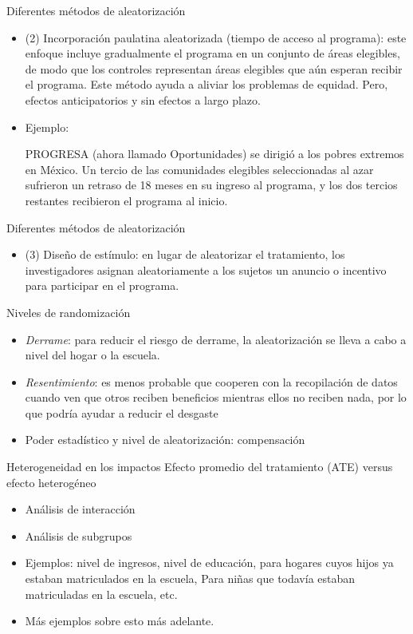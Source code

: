 \documentclass[11pt, aspectratio=169, compress]{beamer}
\begin{document}
\begin{frame}{Diferentes métodos de aleatorización}
	\begin{itemize}
		\item (2) Incorporación paulatina aleatorizada (tiempo de acceso al programa): este enfoque incluye gradualmente el programa en un conjunto de áreas elegibles, de modo que los controles representan áreas elegibles que aún esperan recibir el programa. Este método ayuda a aliviar los problemas de equidad. Pero, efectos anticipatorios y sin efectos a largo plazo.	
		\item Ejemplo: 
		
		PROGRESA (ahora llamado Oportunidades) se dirigió a los pobres extremos en México. Un tercio de las comunidades elegibles seleccionadas al azar sufrieron un retraso de 18 meses en su ingreso al programa, y los dos tercios restantes recibieron el programa al inicio.
	\end{itemize}
\end{frame}
\begin{frame}{Diferentes métodos de aleatorización}
	\begin{itemize}
		\item (3) Diseño de estímulo: en lugar de aleatorizar el tratamiento, los investigadores asignan aleatoriamente a los sujetos un anuncio o incentivo para participar en el programa.
	\end{itemize}
\end{frame}
\begin{frame}{Niveles de randomización}
	\begin{itemize}
		\item \textit{Derrame}: para reducir el riesgo de derrame, la aleatorización se lleva a cabo a nivel del hogar o la escuela.
		\item \textit{Resentimiento}: es menos probable que cooperen con la recopilación de datos cuando ven que otros reciben beneficios mientras ellos no reciben nada, por lo que podría ayudar a reducir el desgaste
		\item Poder estadístico y nivel de aleatorización: compensación
	\end{itemize}
\end{frame}
\begin{frame}{Heterogeneidad en los impactos}
	Efecto promedio del tratamiento (ATE) versus efecto heterogéneo
	\begin{itemize}
		\item Análisis de interacción
		\item Análisis de subgrupos
		\item Ejemplos: nivel de ingresos, nivel de educación, para hogares cuyos hijos ya estaban matriculados
		en la escuela, Para niñas que todavía estaban matriculadas en la escuela, etc.
    \item Más ejemplos sobre esto más adelante.
	\end{itemize}
\end{frame}
\end{document}
